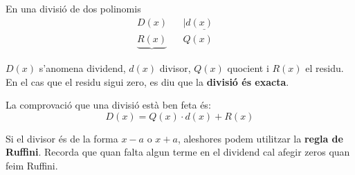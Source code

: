 \begin{theorybox}
	\begin{multicols}{2}
		\centering
	 \end{multicols}
En una divisió de dos polinomis
\[ 
	\begin{array}{lll}
	D(x) & & |\underline{d(x)\quad} \\
	\underbrace{R(x)} & & Q(x)
	\end{array}
\]

$D(x)$ s'anomena dividend, $d(x)$ divisor, $Q(x)$ quocient i $R(x)$ el residu. En el cas que el residu sigui zero, es diu que la \textbf{divisió és exacta}.

La comprovació que una divisió està ben feta és:
\[ \boxed{ D(x)= Q(x)\cdot d(x) + R(x)}  \]

Si el divisor és de la forma $x-a$ o $x+a$, aleshores podem utilitzar la \textbf{regla de Ruffini}. Recorda que quan falta algun terme en el dividend cal afegir zeros quan feim Ruffini.
   

   
\end{theorybox}

\pagebreak

